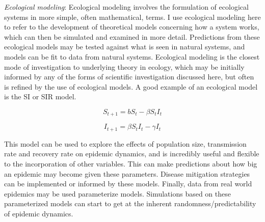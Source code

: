 \documentclass[12pt]{article}
\begin{document}
\textit{Ecological modeling}: Ecological modeling involves the formulation of ecological systems in more simple, often mathematical, terms. I use ecological modeling here to refer to the development of theoretical models concerning how a system works, which can then be simulated and examined in more detail. Predictions from these ecological models may be tested against what is seen in natural systems, and models can be fit to data from natural systems. Ecological modeling is the closest mode of investigation to underlying theory in ecology, which may be initially informed by any of the forms of scientific investigation discussed here, but often is refined by the use of ecological models. A good example of an ecological model is the SI or SIR model.


$$ S_{t+1} = bS_{t} - \beta S_{t} I_{t} $$

$$ I_{t+1} = \beta S_{t}I_{t} - \gamma I_{t} $$ 


This model can be used to explore the effects of population size, transmission rate and recovery rate on epidemic dynamics, and is incredibly useful and flexible to the incorporation of other variables. This can make predictions about how big an epidemic may become given these parameters. Disease mitigation strategies can be implemented or informed by these models. Finally, data from real world epidemics may be used parameterize models. Simulations based on these parameterized models can start to get at the inherent randomness/predictability of epidemic dynamics. 






%









%
\end{document}
